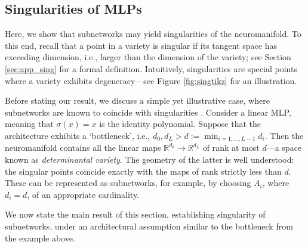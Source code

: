 \documentclass{article} %
\theoremstyle{plain}%
\newtheorem{cor}[thm]{Corollary}
\theoremstyle{definition}
\theoremstyle{remark}
\begin{document}

\subsection{Singularities of MLPs}\label{sec:singularity}
Here, we show that subnetworks may yield singularities of the neuromanifold. To this end, recall that a point in a variety is singular if its tangent space has exceeding dimension, i.e., larger than the dimension of the variety; see Section \ref{sec:app_sing} for a formal definition. Intuitively, singularities are special points where a variety exhibits degeneracy---see Figure \ref{fig:singtikz} for an illustration. 

Before stating our result, we discuss a simple yet illustrative case, where subnetworks are known to coincide with singularities \citep{trager2019pure, marchetti2025invitationneuroalgebraicgeometry}. Consider a linear MLP, meaning that $\sigma(x) = x $ is the identity polynomial. Suppose that the architecture exhibits a `bottleneck', i.e., $d_0, d_L > d:=\min_{i=1, \ldots, L-1}d_i$. Then the neuromanifold contains all the linear maps $\mathbb{R}^{d_0} \rightarrow \mathbb{R}^{d_L}$ of rank at most $d$---a space known as \emph{determinantal variety}. The geometry of the latter is well understood: the singular points coincide exactly with the maps of rank strictly less than $d$. These can be represented as subnetworks, for example, by choosing $A_i$, where $d_i = d$, of an appropriate cardinality.

We now state the main result of this section, establishing singularity of subnetworks, under an architectural assumption similar to the bottleneck from  the example above.
\end{document}
